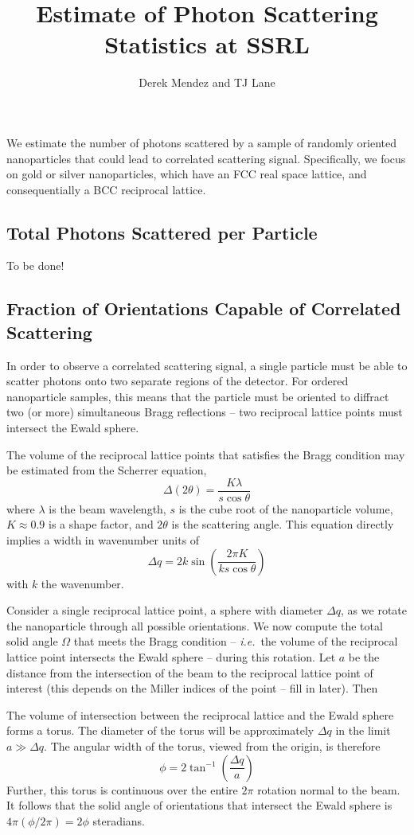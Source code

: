 \documentclass[11pt]{amsart}
\title{Estimate of Photon Scattering Statistics at SSRL}
\author{Derek Mendez and TJ Lane}
\begin{document}
\maketitle

We estimate the number of photons scattered by a sample of randomly oriented nanoparticles that could lead to correlated scattering signal. Specifically, we focus on gold or silver nanoparticles, which have an FCC real space lattice, and consequentially a BCC reciprocal lattice.

\subsection*{Total Photons Scattered per Particle}

To be done!

\subsection*{Fraction of Orientations Capable of Correlated Scattering}

In order to observe a correlated scattering signal, a single particle must be able to scatter photons onto two separate regions of the detector. For ordered nanoparticle samples, this means that the particle must be oriented to diffract two (or more) simultaneous Bragg reflections -- two reciprocal lattice points must intersect the Ewald sphere.

The volume of the reciprocal lattice points that satisfies the Bragg condition may be estimated from the Scherrer equation,
\[
\Delta(2 \theta) = \frac{K \lambda}{s \cos \theta}
\]
where $\lambda$ is the beam wavelength, $s$ is the cube root of the nanoparticle volume, $K \approx 0.9$ is a shape factor, and $2 \theta$ is the scattering angle. This equation directly implies a width in wavenumber units of
\[
\Delta q = 2k \sin \left( \frac{2 \pi K }{k s \cos \theta} \right)
\]
with $k$ the wavenumber.

Consider a single reciprocal lattice point, a sphere with diameter $\Delta q$, as we rotate the nanoparticle through all possible orientations. We now compute the total solid angle $\Omega$ that meets the Bragg condition  -- \textit{i.e.}~the volume of the reciprocal lattice point intersects the Ewald sphere -- during this rotation. Let $a$ be the distance from the intersection of the beam to the reciprocal lattice point of interest (this depends on the Miller indices of the point -- fill in later). Then 

The volume of intersection between the reciprocal lattice and the Ewald sphere forms a torus. The diameter of the torus will be approximately $\Delta q$ in the  limit $a \gg \Delta q$. The angular width of the torus, viewed from the origin, is therefore
\[
\phi = 2 \tan^{-1} \left( \frac{ \Delta q }{a} \right)
\]
Further, this torus is continuous over the entire $2 \pi$ rotation normal to the beam. It follows that the solid angle of orientations that intersect the Ewald sphere is $4 \pi (\phi / 2 \pi ) = 2 \phi$ steradians.
\end{document}
